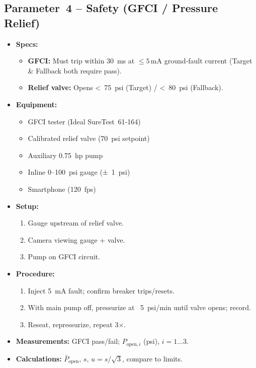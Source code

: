 \documentclass[12pt]{report}
\begin{document}
\subsection{Parameter 4 – Safety (GFCI / Pressure Relief)}
\begin{itemize}[leftmargin=*]
  \item \textbf{Specs:}
    \begin{itemize}[leftmargin=1.5em]
      \item \textbf{GFCI:} Must trip within 30 ms at $\le5\,\mathrm{mA}$ ground‑fault current (Target \& Fallback both require pass).
      \item \textbf{Relief valve:} Opens < 75 psi (Target) / < 80 psi (Fallback).
    \end{itemize}
  \item \textbf{Equipment:}
    \begin{itemize}[leftmargin=1.5em]
      \item GFCI tester (Ideal SureTest 61‑164)  
      \item Calibrated relief valve (70 psi setpoint)  
      \item Auxiliary \SI{0.75}{hp} pump  
      \item Inline 0–100 psi gauge (± 1 psi)  
      \item Smartphone (120 fps)
    \end{itemize}
  \item \textbf{Setup:}
    \begin{enumerate}[label=\arabic*., leftmargin=*]
      \item Gauge upstream of relief valve.  
      \item Camera viewing gauge + valve.
      \item Pump on GFCI circuit.
    \end{enumerate}
  \item \textbf{Procedure:}
    \begin{enumerate}[label=\arabic*., leftmargin=*]
      \item Inject 5 mA fault; confirm breaker trips/resets.  
      \item With main pump off, pressurize at ~5 psi/min until valve opens; record.  
      \item Reseat, repressurize, repeat 3×.
    \end{enumerate}
  \item \textbf{Measurements:} GFCI pass/fail; $P_{\mathrm{open},i}$ (psi), $i=1\ldots3$.
  \item \textbf{Calculations:} $\bar P_{\mathrm{open}},\,s,\,u=s/\sqrt{3}$, compare to limits.
\end{itemize}
\end{document}
